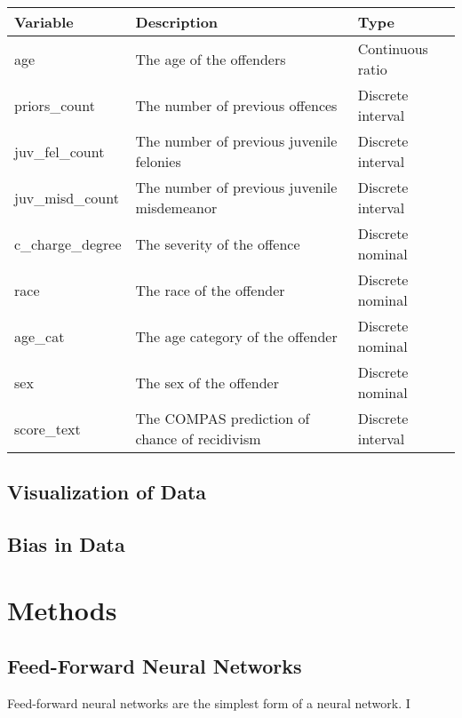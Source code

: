 \documentclass[11pt, fleqn, titlepage]{article}
\begin{document}
		
		\begin{table}[H]\label{resultater}
			\centering
			\begin{tabular}{l l l}
				Variable & Description & Type \\ \hline
				age & The age of the offenders & Continuous ratio \\
				priors\_count & The number of previous offences & Discrete interval \\
				juv\_fel\_count & The number of previous juvenile felonies & Discrete interval \\
				juv\_misd\_count & The number of previous juvenile misdemeanor & Discrete interval \\
				c\_charge\_degree & The severity of the offence & Discrete nominal \\
				race & The race of the offender & Discrete nominal \\
				age\_cat & The age category of the offender & Discrete nominal \\
				sex & The sex of the offender & Discrete nominal \\
				score\_text & The COMPAS prediction of chance of recidivism & Discrete interval
				
				
				
				
			\end{tabular}
		\end{table}
		
		
		\subsection{Visualization of Data}
		
		
		\subsection{Bias in Data}
		
		
	\section{Methods}
	 
	\subsection{Feed-Forward Neural Networks}\label{Feed-forward neural}
	Feed-forward neural networks are the simplest form of a neural network. I
	 
\end{document}
